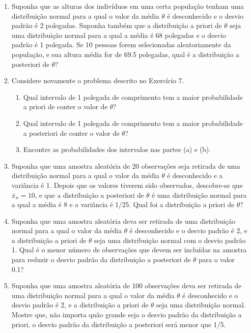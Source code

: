 \begin{enumerate}
    \item Suponha que as alturas dos indivíduos em uma certa população tenham uma distribuição normal para a qual o valor da média $\theta$ é desconhecido e o desvio padrão é 2 polegadas. Suponha também que a distribuição a priori de $\theta$ seja uma distribuição normal para a qual a média é 68 polegadas e o desvio padrão é 1 polegada. Se 10 pessoas forem selecionadas aleatoriamente da população, e sua altura média for de 69.5 polegadas, qual é a distribuição a posteriori de $\theta$?
    
    \item Considere novamente o problema descrito no Exercício 7.
    \begin{enumerate}[label=(\alph*)]
        \item Qual intervalo de 1 polegada de comprimento tem a maior probabilidade a priori de conter o valor de $\theta$?
        \item Qual intervalo de 1 polegada de comprimento tem a maior probabilidade a posteriori de conter o valor de $\theta$?
        \item Encontre as probabilidades dos intervalos nas partes (a) e (b).
    \end{enumerate}
    
    \item Suponha que uma amostra aleatória de 20 observações seja retirada de uma distribuição normal para a qual o valor da média $\theta$ é desconhecido e a variância é 1. Depois que os valores tiverem sido observados, descobre-se que $\bar{x}_n=10$, e que a distribuição a posteriori de $\theta$ é uma distribuição normal para a qual a média é 8 e a variância é 1/25. Qual foi a distribuição a priori de $\theta$?
    
    \item Suponha que uma amostra aleatória deva ser retirada de uma distribuição normal para a qual o valor da média $\theta$ é desconhecido e o desvio padrão é 2, e a distribuição a priori de $\theta$ seja uma distribuição normal com o desvio padrão 1. Qual é o menor número de observações que devem ser incluídas na amostra para reduzir o desvio padrão da distribuição a posteriori de $\theta$ para o valor 0.1?
    
    \item Suponha que uma amostra aleatória de 100 observações deva ser retirada de uma distribuição normal para a qual o valor da média $\theta$ é desconhecido e o desvio padrão é 2, e a distribuição a priori de $\theta$ seja uma distribuição normal. Mostre que, não importa quão grande seja o desvio padrão da distribuição a priori, o desvio padrão da distribuição a posteriori será menor que 1/5.
    

\end{enumerate}
